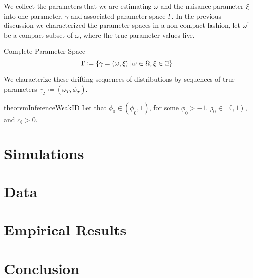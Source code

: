 \documentclass[11pt, letterpaper, twoside, final]{article}
\begin{document}
We collect the parameters that we are estimating $\omega$ and the nuisance parameter $\xi$ into one parameter,
$\gamma$ and associated parameter space $\Gamma$.
In the previous discussion we characterized the parameter spaces in a non-compact fashion, let $\omega^{*}$ be a
compact subset of $\omega$, where the true parameter values live.

\begin{defn}{Complete Parameter Space}
    \begin{equation}
        \Gamma \coloneqq \left\lbrace \gamma = (\omega, \xi) \,\middle\vert\, \omega \in \Omega, \xi \in \Xi \right\rbrace 
    \end{equation}
\end{defn}

We characterize these drifting sequences of distributions by sequences of true parameters $\gamma_T \coloneqq
(\omega_T, \phi_T)$.



\begin{restatable}{theorem}{InferenceWeakID}
    Let that $\phi_0  \in \left(\underline{\phi}_0,1\right)$, for some $\underline{\phi}_0 > -1$. 
    $\rho_0 \in \left[0,1\right)$, and $c_0 > 0$. 

\end{restatable}


\section{Simulations}

\section{Data}\label{sec:data}

\section{Empirical Results}

\section{Conclusion}

\clearpage
\end{document}
